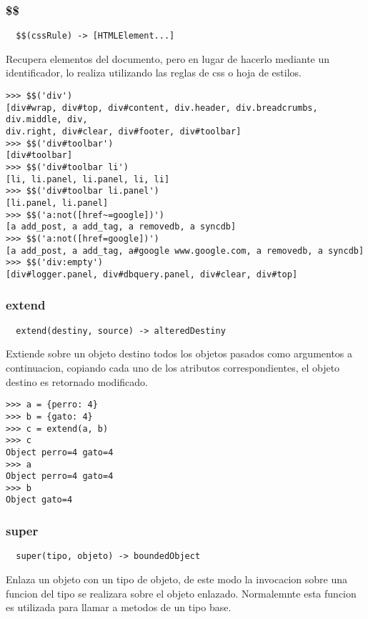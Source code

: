 \subsubsection*{\$\$}
\begin{verbatim}
  $$(cssRule) -> [HTMLElement...]
\end{verbatim}
Recupera elementos del documento, pero en lugar de hacerlo mediante un
identificador, lo realiza utilizando las reglas de css o hoja de estilos.
\begin{lstlisting}[style=consola]
>>> $$('div')
[div#wrap, div#top, div#content, div.header, div.breadcrumbs, div.middle, div,
div.right, div#clear, div#footer, div#toolbar]
>>> $$('div#toolbar')
[div#toolbar]
>>> $$('div#toolbar li')
[li, li.panel, li.panel, li, li]
>>> $$('div#toolbar li.panel')
[li.panel, li.panel]
>>> $$('a:not([href~=google])')
[a add_post, a add_tag, a removedb, a syncdb]
>>> $$('a:not([href=google])')
[a add_post, a add_tag, a#google www.google.com, a removedb, a syncdb]
>>> $$('div:empty')
[div#logger.panel, div#dbquery.panel, div#clear, div#top]
\end{lstlisting}

\subsubsection*{extend}
\begin{verbatim}
  extend(destiny, source) -> alteredDestiny
\end{verbatim}
Extiende sobre un objeto destino todos los objetos pasados como argumentos a
continuacion, copiando cada uno de los atributos correspondientes, el objeto
destino es retornado modificado.
\begin{lstlisting}[style=consola]
>>> a = {perro: 4}
>>> b = {gato: 4}
>>> c = extend(a, b)
>>> c
Object perro=4 gato=4
>>> a
Object perro=4 gato=4
>>> b
Object gato=4
\end{lstlisting}

\subsubsection*{super}
\begin{verbatim}
  super(tipo, objeto) -> boundedObject
\end{verbatim}
Enlaza un objeto con un tipo de objeto, de este modo la invocacion sobre una
funcion del tipo se realizara sobre el objeto enlazado.
Normalemnte esta funcion es utilizada para llamar a metodos de un tipo base.

